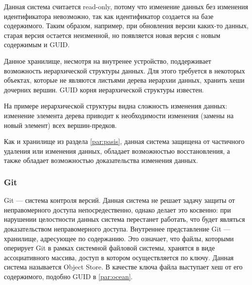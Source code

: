 Данная система считается read-only, потому что изменение данных без изменения идентификатора невозможно, так как идентификатор создается на базе содержимого. Таким образом, например, при обновления версии каких-то данных, старая версия остается неизменной, но появляется новая версия с новым содержимым и GUID.

Данное хранилище, несмотря на внутренее устройство, поддерживает возможность иерархической структуры данных. Для этого требуется в некоторых объектах, которые не являются листьями дерева иерархии данных, хранить хеши дочерних вершин. GUID корня иерархической структуры известен.

На примере иерархической структуры видна сложность изменения данных: изменение элемента дерева приводит к необходимости изменения (замены на новый элемент) всех вершин-предков.

Как и хранилище из раздела \ref{par:pasis}, данная система защищена от частичного удаления или изменения данных, обладает возможностью восстановления, а также обладает возможностью доказательства изменения данных.

\subsubsection{Git}

Git \cite{git} --- система контроля версий. Данная система не решает задачу защиты от неправомерного доступа непосредественно, однако делает это косвенно: при нарушении целостности данных система перестанет работать, что будет являться доказательством неправомерного доступа. Внутреннее представление Git --- хранилище, адресующее по содержанию. Это означает, что файлы, которыми оперирует Git в рамках системной файловой системы, хранятся в виде ассоциативного массива, доступ в котором осуществляется по ключу. Данная система называется Object Store. В качестве ключа файла выступает хеш от его содержимого, подобно GUID в \ref{par:ocean}.

